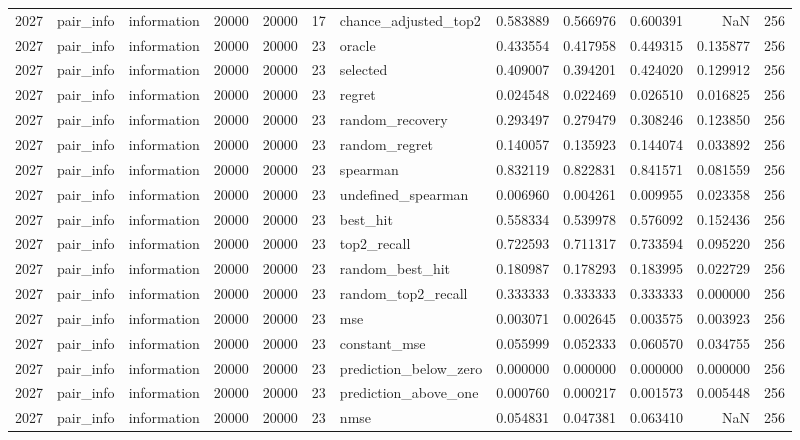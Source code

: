 \begin{tabular}{rllrrrlrrrrr}
2027 & pair_info & information & 20000 & 20000 & 17 & chance_adjusted_top2 & 0.583889 & 0.566976 & 0.600391 & NaN & 256 \\
2027 & pair_info & information & 20000 & 20000 & 23 & oracle & 0.433554 & 0.417958 & 0.449315 & 0.135877 & 256 \\
2027 & pair_info & information & 20000 & 20000 & 23 & selected & 0.409007 & 0.394201 & 0.424020 & 0.129912 & 256 \\
2027 & pair_info & information & 20000 & 20000 & 23 & regret & 0.024548 & 0.022469 & 0.026510 & 0.016825 & 256 \\
2027 & pair_info & information & 20000 & 20000 & 23 & random_recovery & 0.293497 & 0.279479 & 0.308246 & 0.123850 & 256 \\
2027 & pair_info & information & 20000 & 20000 & 23 & random_regret & 0.140057 & 0.135923 & 0.144074 & 0.033892 & 256 \\
2027 & pair_info & information & 20000 & 20000 & 23 & spearman & 0.832119 & 0.822831 & 0.841571 & 0.081559 & 256 \\
2027 & pair_info & information & 20000 & 20000 & 23 & undefined_spearman & 0.006960 & 0.004261 & 0.009955 & 0.023358 & 256 \\
2027 & pair_info & information & 20000 & 20000 & 23 & best_hit & 0.558334 & 0.539978 & 0.576092 & 0.152436 & 256 \\
2027 & pair_info & information & 20000 & 20000 & 23 & top2_recall & 0.722593 & 0.711317 & 0.733594 & 0.095220 & 256 \\
2027 & pair_info & information & 20000 & 20000 & 23 & random_best_hit & 0.180987 & 0.178293 & 0.183995 & 0.022729 & 256 \\
2027 & pair_info & information & 20000 & 20000 & 23 & random_top2_recall & 0.333333 & 0.333333 & 0.333333 & 0.000000 & 256 \\
2027 & pair_info & information & 20000 & 20000 & 23 & mse & 0.003071 & 0.002645 & 0.003575 & 0.003923 & 256 \\
2027 & pair_info & information & 20000 & 20000 & 23 & constant_mse & 0.055999 & 0.052333 & 0.060570 & 0.034755 & 256 \\
2027 & pair_info & information & 20000 & 20000 & 23 & prediction_below_zero & 0.000000 & 0.000000 & 0.000000 & 0.000000 & 256 \\
2027 & pair_info & information & 20000 & 20000 & 23 & prediction_above_one & 0.000760 & 0.000217 & 0.001573 & 0.005448 & 256 \\
2027 & pair_info & information & 20000 & 20000 & 23 & nmse & 0.054831 & 0.047381 & 0.063410 & NaN & 256 \\

\end{tabular}
